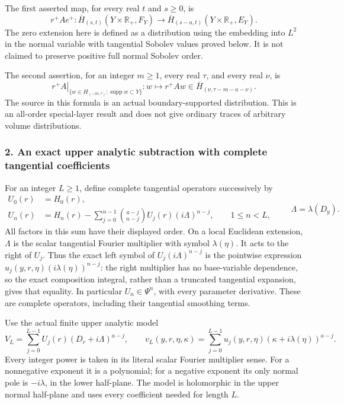 \documentclass[
  11pt,
]{article}
\begin{document}
The first asserted map, for every real \(t\) and \(s\geq0\), is \[
 r^+Ae^+:
 \overline H_{(s,t)}(Y\times\mathbb R_+,F_Y)
 \longrightarrow
 \overline H_{(s-a,t)}(Y\times\mathbb R_+,E_Y).
 \tag{MH3}
\] The zero extension here is defined as a distribution using the
embedding into \(L^2\) in the normal variable with tangential Sobolev
values proved below. It is not claimed to preserve positive full normal
Sobolev order.

The second assertion, for an integer \(m\geq1\), every real \(\tau\),
and every real \(\nu\), is \[
 \left.
 r^+A\right|_{\{w\in H_{(-m,\tau)}:\operatorname{supp}w\subset Y\}}
 : w\longmapsto r^+Aw
 \in\overline H_{(\nu,\tau-m-a-\nu)}.
 \tag{MH4}
\] The source in this formula is an actual boundary-supported
distribution. This is an all-order special-layer result and does not
give ordinary traces of arbitrary volume distributions.

\subsubsection{2. An exact upper analytic subtraction with complete
tangential
coefficients}\label{an-exact-upper-analytic-subtraction-with-complete-tangential-coefficients}

For an integer \(L\geq1\), define complete tangential operators
successively by \[
 \begin{split}
 U_0(r)&=H_0(r),\\
 U_n(r)&=H_n(r)-
  \sum_{j=0}^{n-1}\binom{a-j}{n-j}
      U_j(r)(i\Lambda)^{n-j},\qquad 1\leq n<L,
 \end{split}
 \qquad \Lambda=\lambda(D_y).
 \tag{MH5}
\] All factors in this sum have their displayed order. On a local
Euclidean extension, \(\Lambda\) is the scalar tangential Fourier
multiplier with symbol \(\lambda(\eta)\). It acts to the right of
\(U_j\). Thus the exact left symbol of \(U_j(i\Lambda)^{n-j}\) is the
pointwise expression \(u_j(y,r,\eta)(i\lambda(\eta))^{n-j}\): the right
multiplier has no base-variable dependence, so the exact composition
integral, rather than a truncated tangential expansion, gives that
equality. In particular \(U_n\in\Psi^n\), with every parameter
derivative. These are complete operators, including their tangential
smoothing terms.

Use the actual finite upper analytic model \[
 V_L=
 \sum_{j=0}^{L-1}U_j(r)(D_r+i\Lambda)^{a-j},
 \qquad
 v_L(y,r,\eta,\kappa)=
 \sum_{j=0}^{L-1}u_j(y,r,\eta)(\kappa+i\lambda(\eta))^{a-j}.
 \tag{MH6}
\] Every integer power is taken in its literal scalar Fourier multiplier
sense. For a nonnegative exponent it is a polynomial; for a negative
exponent its only normal pole is \(-i\lambda\), in the lower half-plane.
The model is holomorphic in the upper normal half-plane and uses every
coefficient needed for length \(L\).
\end{document}
